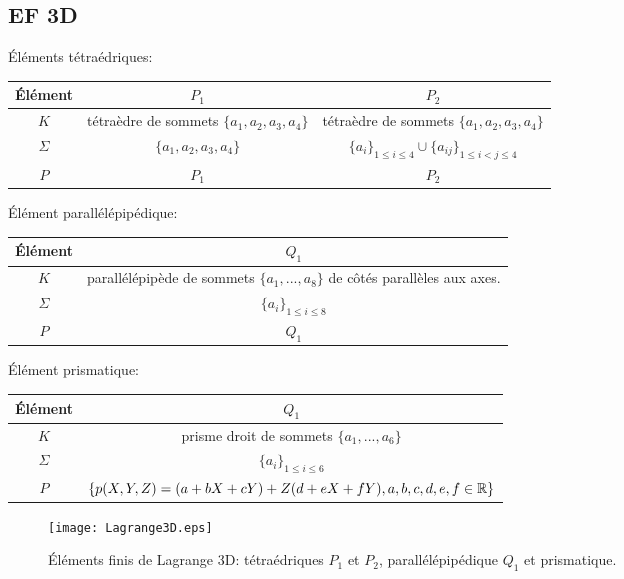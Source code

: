 \medskip
\subsection*{EF 3D}

Éléments tétraédriques:
\begin{center}
\begin{tabular}{c|cc}
Élément & $P_1$ & $P_2$ \\
\hline
$K$	      & tétraèdre de sommets $\{a_1, a_2, a_3, a_4\}$ & tétraèdre de sommets $\{a_1, a_2, a_3, a_4\}$\\
$\Sigma$   & $\{a_1, a_2, a_3, a_4\}$ & $\{a_i\}_{1\le i\le4}\cup\{a_{ij}\}_{1\le i<j\le 4}$ \\
$P$            & $P_1$ & $P_2$ \\
\hline
\end{tabular}
\end{center}

Élément parallélépipédique:
\begin{center}
\begin{tabular}{c|c}
Élément & $Q_1$\\
\hline
$K$ & parallélépipède de sommets $\{a_1,..., a_8\}$ de côtés parallèles aux axes.\\
$\Sigma$ & $\{a_i\}_{1\le i\le8}$\\
$P$ & $Q_1$\\
\hline
\end{tabular}
\end{center}

Élément prismatique:
\begin{center}
\begin{tabular}{c|c}
Élément & $Q_1$\\
\hline
$K$ & prisme droit de sommets $\{a_1,..., a_6\}$\\
$\Sigma$ & $\{a_i\}_{1\le i\le6}$\\
$P$ & $\{p(X,Y,Z) = (a + bX + cY ) + Z(d + eX + fY ), a,b,c,d,e,f\in\mathbb R\}$\\
\hline
\end{tabular}
\end{center}
\begin{figure}[ht]
\begin{center}
\texttt{[image: Lagrange3D.eps]}
\end{center}
\caption{\label{Lagrange3D} Éléments finis de Lagrange 3D:
tétraédriques $P_1$ et $P_2$, parallélépipédique $Q_1$ et prismatique.}
\end{figure}



